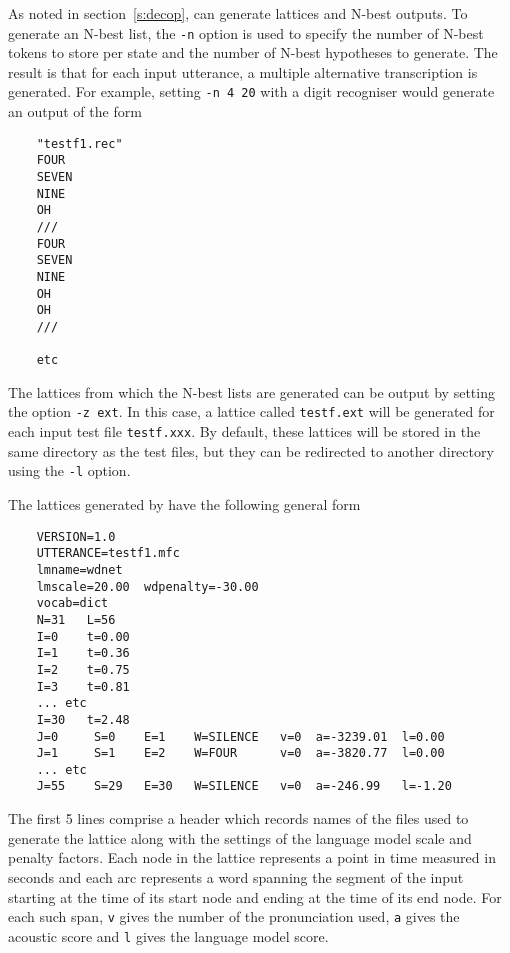 
As noted in section~\ref{s:decop},  can generate 
lattices
and N-best outputs.  To generate an N-best list, the \texttt{-n} option
is used to specify the number of N-best tokens to store per state and
the number of N-best hypotheses to generate.  The result is that
for each input utterance, a multiple alternative 
transcription is generated.
For example, setting \texttt{-n 4 20} with a digit 
recogniser would generate an output of the form
\begin{verbatim}
    "testf1.rec"
    FOUR
    SEVEN
    NINE
    OH
    /// 
    FOUR
    SEVEN
    NINE
    OH
    OH
    /// 

    etc
\end{verbatim}


The lattices from which the N-best lists are generated can be output by setting
the option \texttt{-z ext}.  In this case, a lattice called \texttt{testf.ext} will
be generated for each input test file \texttt{testf.xxx}.  By default, these lattices
will  be stored in the same directory as the test files, but they can be redirected
to another directory using the \texttt{-l} option.

The lattices generated by  have the following general form
\begin{verbatim}
    VERSION=1.0
    UTTERANCE=testf1.mfc
    lmname=wdnet
    lmscale=20.00  wdpenalty=-30.00
    vocab=dict
    N=31   L=56   
    I=0    t=0.00  
    I=1    t=0.36  
    I=2    t=0.75  
    I=3    t=0.81
    ... etc
    I=30   t=2.48  
    J=0     S=0    E=1    W=SILENCE   v=0  a=-3239.01  l=0.00    
    J=1     S=1    E=2    W=FOUR      v=0  a=-3820.77  l=0.00    
    ... etc
    J=55    S=29   E=30   W=SILENCE   v=0  a=-246.99   l=-1.20   
\end{verbatim}

The first 5 lines comprise a header which records names of the files used to
generate the lattice along with the settings of the language model scale and
penalty factors. Each node in the lattice represents a point in time measured in
seconds and each arc represents a word spanning the segment of the input
starting at the time of its start node and ending at the time of its end node.  
For each such span, \texttt{v} gives the number of the pronunciation used, 
\texttt{a} gives the acoustic score and \texttt{l} gives the language model
score.

